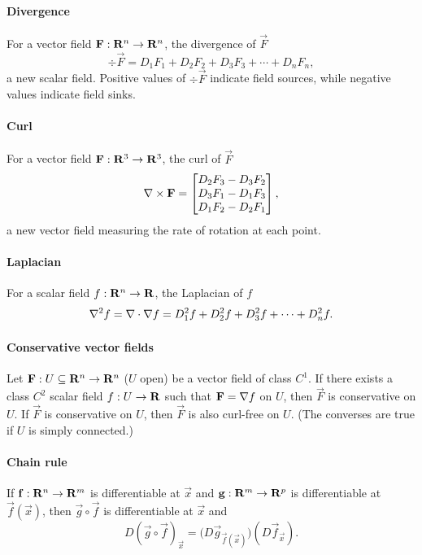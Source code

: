 \documentclass[10pt,landscape]{article}
\begin{document}
\begin{multicols*}{3}
\paragraph{Divergence}
For a vector field $\mathbf{F} : \mathbf{R}^n \to \mathbf{R}^n$, the divergence of $\vec F$
\begin{equation}
  \div\vec F = D_1F_1 + D_2F_2 + D_3F_3 + \cdots + D_nF_n,
\end{equation}
a new scalar field.
Positive values of $\div\vec F$ indicate field sources, while negative values indicate field sinks.

\paragraph{Curl}
For a vector field $\mathbf{F} : \mathbf{R}^3 \to \mathbf{R}^3$, the curl of $\vec F$
\begin{equation}
  \nabla\times\mathbf{F} = \begin{bmatrix} D_2F_3 - D_3F_2 \\ D_3F_1 - D_1F_3 \\ D_1F_2 - D_2F_1 \end{bmatrix},
\end{equation}
a new vector field measuring the rate of rotation at each point.

\paragraph{Laplacian}
For a scalar field $f : \mathbf{R}^n \to \mathbf{R}$, the Laplacian of $f$
\begin{equation}
  \nabla^2 f = \nabla\cdot\nabla f = D_1^2f + D_2^2f + D_3^2f + \cdots + D_n^2f.
\end{equation}

\paragraph{Conservative vector fields}
Let $\mathbf{F} : U \subseteq \mathbf{R}^n \to \mathbf{R}^n$ ($U$ open) be a vector field
of class $C^1$.  If there exists a class $C^2$ scalar field $f : U \to
\mathbf{R}$ such that $\mathbf{F} = \nabla f$ on $U$, then $\vec F$ is conservative
on $U$.  If $\vec F$ is conservative on $U$, then $\vec F$ is also
curl-free on $U$.  (The converses are true if $U$ is simply connected.)

\paragraph{Chain rule}
If $\mathbf{f} : \mathbf{R}^n \to \mathbf{R}^m$ is differentiable at $\vec x$ and $\mathbf{g}
: \mathbf{R}^m \to \mathbf{R}^p$ is differentiable at $\vec f(\vec x)$, then $\vec g
\circ \vec f$ is differentiable at $\vec x$ and
\begin{equation}
  \label{eq:chainrule}
  D(\vec g \circ \vec f)_{\vec x} = \big(D\vec g_{\vec f(\vec x)}\big)(D\vec f_{\vec x}).
\end{equation}


\end{multicols*}
\end{document}
